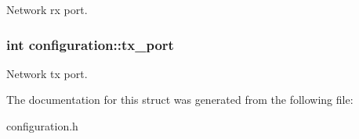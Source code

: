\-Network rx port. \hypertarget{structconfiguration_af79c6d51736c36e2a56c6837bcbaa1e5}{
\subsubsection[{tx\-\_\-port}]{\setlength{\rightskip}{0pt plus 5cm}int {\bf configuration\-::tx\-\_\-port}}}\label{structconfiguration_af79c6d51736c36e2a56c6837bcbaa1e5}
\-Network tx port. 

\-The documentation for this struct was generated from the following file\-:\begin{DoxyCompactItemize}
\item 
configuration.\-h\end{DoxyCompactItemize}
